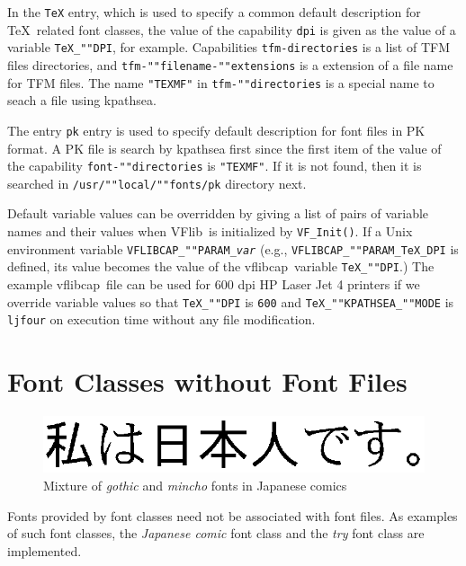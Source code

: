 \documentclass{cah-gut}
\newcommand{\pkg}[1]{\textsf{#1}}
\newcommand{\prog}[1]{\texttt{#1}}
\newcommand{\var}[1]{\textit{#1}}
\newcommand{\VFlib}{\pkg{VFlib}}
\newcommand{\vflibcap}{\pkg{vflibcap}}
\begin{document}
In the \prog{TeX} entry, which is used to specify a common 
default description  for \TeX\ related font classes, 
the value of the capability \prog{dpi} 
is given as the value of a variable \prog{TeX\_""DPI}, for example.
Capabilities \prog{tfm-directories} is a list of TFM files directories, 
and \prog{tfm-""filename-""extensions} is a extension of a file name 
for TFM files.
The name \prog{"TEXMF"} in \prog{tfm-""directories} is a special name 
to seach a file using \pkg{kpathsea}.

The entry \prog{pk} entry is used to specify default description 
for font files in PK format.
A PK file is search by \pkg{kpathsea} first since the first item
of the value of the capability \prog{font-""directories} is \prog{"TEXMF"}.
If it is not found, then it is searched in \prog{/usr/""local/""fonts/pk}
directory next.

Default variable values can be overridden by giving a list of pairs of
variable names and their values when \VFlib\ is initialized by
\prog{VF\_Init()}. If a Unix environment variable
\prog{VFLIBCAP\_""PARAM\_\var{var}} (e.g.,
\prog{VFLIBCAP\_""PARAM\_TeX\_DPI} is defined, its value becomes the
value of the \vflibcap\ variable \prog{TeX\_""DPI}.)
The example \vflibcap\ file can be used for 600 dpi HP Laser Jet 4 printers 
if we override variable values so that
\prog{TeX\_""DPI} is \prog{600} and \prog{TeX\_""KPATHSEA\_""MODE} is
\prog{ljfour} on execution time without any file modification.



\section{Font Classes without Font Files}
\label{SEC:ClassesWithoutFontFiles}

\begin{figure}
\begin{center}
\mbox{\includegraphics[scale=0.75]{comic-jp.eps}}
\end{center}
\caption{Mixture of {\it gothic} and {\it mincho} fonts in Japanese comics}
\label{FIG:JpComics}
\end{figure}

Fonts provided by font classes need not be associated with font files.
As examples of such font classes, 
the {\em Japanese comic} font class and
the {\em try} font class are implemented.
\end{document}
